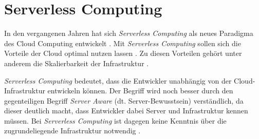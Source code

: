 \section{Serverless Computing} %
\label{sec:serverless-serveraware}





In den vergangenen Jahren hat sich \textit{Serverless Computing} als neues Paradigma des Cloud Computing entwickelt \cite[Vgl.][S. 44]{Castro2019}\cite[Vgl.][S. 64]{Anel2020}. Mit \textit{Serverless Computing} sollen sich die Vorteile der Cloud optimal nutzen lassen \cite[Vgl.][S. 6]{Eivy2017}\cite[Vgl.][S. 8]{Jonas2019}. Zu diesen Vorteilen gehört unter anderem die Skalierbarkeit der Infrastruktur \cite[Vgl.][S. 1ff]{Armbrust2009}\cite[Vgl.][S. 234]{Villamizar2017}\cite[Vgl.][S. 884]{Adzic2017}.

\textit{Serverless Computing} bedeutet, dass die Entwickler unabhängig von der Cloud-Infrastruktur entwickeln können. Der Begriff wird noch besser durch den gegenteiligen Begriff \textit{Server Aware} (dt. Server-Bewusstsein) verständlich, da dieser deutlich macht, dass Entwickler dabei Server und Infrastruktur kennen müssen. Bei \textit{Serverless Computing} ist dagegen keine Kenntnis über die zugrundeliegende Infrastruktur notwendig \cite[Vgl.][S. 5]{Jonas2019}\cite[Vgl.][S. 1]{Hellerstein2018}\cite[Vgl.][S. 46]{Castro2019}\cite[Vgl.][S. 64]{Anel2020}.

